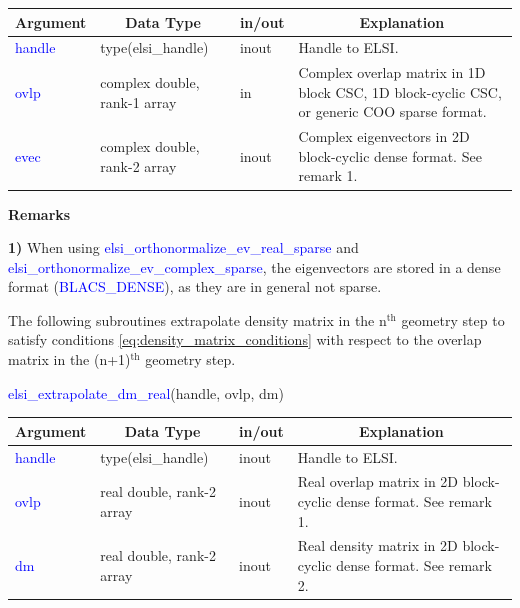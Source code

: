 \documentclass{report}
\begin{document}
\begin{tabular}[]{|p{20mm}|p{45mm}|p{15mm}|p{85mm}|}
\hline
\multicolumn{1}{|c|}{\textbf{Argument}} & \multicolumn{1}{c|}{\textbf{Data Type}} & \multicolumn{1}{c|}{\textbf{in/out}} & \multicolumn{1}{c|}{\textbf{Explanation}}\\
\hline
\textcolor{blue}{handle} & type(elsi\_handle)           & inout & Handle to ELSI.\\
\hline
\textcolor{blue}{ovlp}   & complex double, rank-1 array & in    & Complex overlap matrix in 1D block CSC, 1D block-cyclic CSC, or generic COO sparse format.\\
\hline
\textcolor{blue}{evec}   & complex double, rank-2 array & inout & Complex eigenvectors in 2D block-cyclic dense format. See remark 1.\\
\hline
\end{tabular}

\textbf{Remarks}

\textbf{1)} When using \textcolor{blue}{elsi\_orthonormalize\_ev\_real\_sparse} and \textcolor{blue}{elsi\_orthonormalize\_ev\_complex\_sparse}, the eigenvectors are stored in a dense format (\textcolor{blue}{BLACS\_DENSE}), as they are in general not sparse.

The following subroutines extrapolate density matrix in the n$^\text{th}$ geometry step to satisfy conditions \ref{eq:density_matrix_conditions} with respect to the overlap matrix in the (n+1)$^\text{th}$ geometry step.

\newpage
\begin{labeling}{\hspace{6cm}}
\item [\hspace{0.3cm} \textcolor{blue}{elsi\_extrapolate\_dm\_real}(handle, ovlp, dm)]
\end{labeling}

\begin{tabular}[]{|p{20mm}|p{45mm}|p{15mm}|p{85mm}|}
\hline
\multicolumn{1}{|c|}{\textbf{Argument}} & \multicolumn{1}{c|}{\textbf{Data Type}} & \multicolumn{1}{c|}{\textbf{in/out}} & \multicolumn{1}{c|}{\textbf{Explanation}}\\
\hline
\textcolor{blue}{handle} & type(elsi\_handle)        & inout & Handle to ELSI.\\
\hline
\textcolor{blue}{ovlp}   & real double, rank-2 array & inout & Real overlap matrix in 2D block-cyclic dense format. See remark 1.\\
\hline
\textcolor{blue}{dm}     & real double, rank-2 array & inout & Real density matrix in 2D block-cyclic dense format. See remark 2.\\
\hline
\end{tabular}
\end{document}
